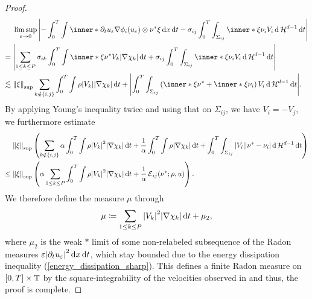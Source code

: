 \begin{proof}
\begin{align*}
		& \limsup_{ \varepsilon \to 0 }
		\abs{
			- \int_{ 0 }^{ T }
			\int
			\inner*{ \partial_{ t } u_{ 
					\varepsilon } }{ \nabla \phi_{ i } ( u_{ 
					\varepsilon } ) 
				\otimes \nu^{ \ast } \xi }
			\dd{ x }
			\dd{ t }
			-
			\sigma_{ i j }
			\int_{ 0 }^{ T }
			\int_{ \Sigma_{ i j } }
			\inner*{ \xi }{ \nu_{ i } }
			V_{ i } 	
			\dd{ \hm^{ d - 1 } }
			\dd{ t }
		}
		\\
		={} &
		\abs{
			\sum_{ 1 \leq k \leq P }
			\sigma_{ i k }
			\int_{ 0 }^{ T }
			\int
			\inner*{ \xi }{ \nu^{ \ast } }
			V_{ k }
			\abs{ \nabla \chi_{ k } }
			\dd{ t }
			+
			\sigma_{ i j }
			\int_{ 0 }^{ T }
			\int_{ \Sigma_{ i j } }
			\inner*{ \xi }{ \nu_{ i } }
			V_{ i }
			\dd{ \hm^{ d - 1 } }
			\dd{ t }
		}
		\\
		\lesssim{} &
		\norm{ \xi }_{ \mathrm{sup} }
		\sum_{ k \notin \{ i , j \} }
		\int_{ 0 }^{ T }
		\int
		\rho
		\abs{ V_{ k } }
		\abs{ \nabla \chi_{ k } }
		\dd{ t }
		+
		\abs{
			\int_{ 0 }^{ T }
			\int_{ \Sigma_{ i j } }
			\left(
			\inner*{ \xi }{ \nu^{ \ast } }
			+
			\inner*{ \xi }{ \nu_{ i } }
			\right)
			V_{ i }
			\dd{ \hm^{ d -1 } }
			\dd{ t }
		}.
	\end{align*}
	By applying Young's inequality twice and using that on $ \Sigma_{ i j } 
	$, we have $ V_{ 
		i } = - V_{ j } $, we furthermore estimate
	\begin{align*}
		& \norm{ \xi }_{ \mathrm{sup} }
		\left(
		\sum_{ k \notin \{ i , j \} }
		\alpha 
		\int_{ 0 }^{ T }
		\int
		\rho
		\abs{ V_{ k } }^{ 2 }
		\abs{ \nabla \chi_{ k } }
		\dd{ t }
		+
		\frac{ 1 }{ \alpha }
		\int_{ 0 }^{ T }
		\int
		\rho
		\abs{ \nabla \chi_{ k } }
		\dd{ t }
		+
		\int_{ 0 }^{ T }
		\int_{ \Sigma_{ i j } }
		\abs{ V_{ i } }
		\abs{ \nu^{ \ast } - \nu_{ i } }
		\dd{ \hm^{ d - 1 } }
		\dd{ t }
		\right)
		\\
		\leq{} &
		\norm{ \xi }_{\mathrm{sup} }
		\left(
		\alpha
		\sum_{ 1 \leq k \leq P }
		\int_{ 0 }^{ T }
		\int
		\rho
		\abs{ V_{ k } }^{ 2 }
		\abs{ \nabla \chi_{ k } }
		\dd{ t}
		+
		\frac{ 1 }{ \alpha }
		\tilt_excess_{ i j } ( \nu^{ \ast } ; \rho , u )
		\right).
	\end{align*}
	We therefore define the measure $ \mu $ through
	\begin{equation*}
		\mu
		\coloneqq
		\sum_{ 1 \leq k \leq P }
		\abs{ V_{ k } }^{ 2 }
		\abs{ \nabla \chi_{ k } }
		\dd{ t }
		+
		\mu_{ 2 },
	\end{equation*}
	where $ \mu_{ 2 } $ is the weak $ \ast $ limit of some non-relabeled 
	subsequence of the Radon measures $ \varepsilon \abs{ \partial_{ t } u_{ 
			\varepsilon } }^{ 2 } \dd{ x } \dd{ t } $, which stay bounded due 
			to the 
	energy dissipation inequality (\ref{energy_dissipation_sharp}).
	This defines a finite Radon measure on $ [ 0 , T ] \times \operatorname{\mathbb{T}} $ by 
	the square-integrability of the velocities observed in 
	 and 
	thus, the proof is complete.
\end{proof}

